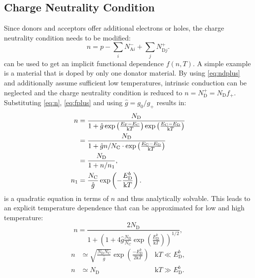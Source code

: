 \subsection{Charge Neutrality Condition}
Since donors and acceptors offer additional electrons or holes, the charge neutrality 
condition needs to be modified:
\begin{equation}
	n = p -\sum_i N_{\mathrm{A}i}^- + \sum_j N_{\mathrm{D}j}^+.
	\label{eq:charge_neutrality}
\end{equation}
 can be used to get an implicit functional dependence $f(n,T)$.
A simple example is a material that is doped by only one donator material.
By using \cref{eq:ndplus} and additionally assume sufficient low
temperatures, intrinsic conduction can be neglected and the charge
neutrality condition is reduced to $n = N_\mathrm{D}^+=N_\mathrm{D} f_+$.
Substituting \cref{eq:n}, \cref{eq:fplus} and using $\hat{g}=g_0/g_+$
results in:
\begin{align}
	\notag
	n& =\frac{N_{\mathrm{D}}}{1+\hat{g}\exp\left( 
		\frac{E_{\mathrm{F}}-E_{\mathrm{C}}}{\mathrm{k}T} \right)
		\exp\left( \frac{E_{\mathrm{C}}-E_{\mathrm{D}}}{\mathrm{k}T} \right)}\\
		\notag
	& =\frac{N_{\mathrm{D}}}{1+ \hat{g}n /N_{\mathrm{C}}\cdot\exp\left( 
		\frac{E_{\mathrm{C}}-E_{\mathrm{D}}}{\mathrm{k}T} \right)} \label{eq:n_quad} \\
	& =\frac{N_{\mathrm{D}}}{1+n / n_{1}},\\
	n_{1} & =	\frac{N_{\mathrm{C}}}{\hat{g}}
	\exp\left( -\frac{E_{\mathrm{D}}^{b}}{\mathrm{k}T} \right).
\end{align}
 is a quadratic equation in terms of $n$ and thus
analytically solvable.
This leads to an explicit temperature dependence that can be approximated
for low and high temperature: 
\begin{equation}
	\label{eq:n_T}
	n = \frac{2N_{\mathrm{D}}}{1+\left( 1+4\hat{g} \frac{N_{\mathrm{D}}}{N_{\mathrm{C}}}
	\exp\left( \frac{E_{\mathrm{D}}^{b}}{\mathrm{k}T} \right) \right)^{1/2}},
\end{equation}
\begin{align}
	\label{eq:n_T_approx_low}
	n & \simeq \sqrt{ \frac{N_{\mathrm{D}}N_{\mathrm{C}}}{\hat{g}}}
	\exp\left( \frac{-E_{\mathrm{D}}^{b}}{2 \mathrm{k}T} \right) & \mathrm{k}T\ll 
	E_{\mathrm{D}}^{b}, \\
	\label{eq:n_T_approx_high}
	n & \simeq N_{\mathrm{D}} & \mathrm{k}T\gg E_{\mathrm{D}}^{b}.
\end{align}

